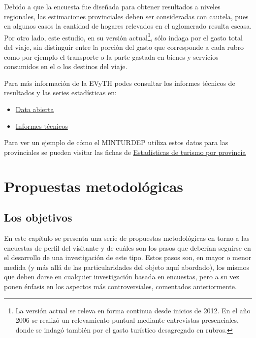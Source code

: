 \documentclass[
]{book}
\providecommand{\tightlist}{%
  \setlength{\itemsep}{0pt}\setlength{\parskip}{0pt}}
\begin{document}
Debido a que la encuesta fue diseñada para obtener resultados a niveles regionales, las estimaciones provinciales deben ser consideradas con cautela, pues en algunos casos la cantidad de hogares relevados en el aglomerado resulta escasa. Por otro lado, este estudio, en su versión actual\footnote{La versión actual se releva en forma continua desde inicios de 2012. En el año 2006 se realizó un relevamiento puntual mediante entrevistas presenciales, donde se indagó también por el gasto turístico desagregado en rubros.}, sólo indaga por el gasto total del viaje, sin distinguir entre la porción del gasto que corresponde a cada rubro como por ejemplo el transporte o la parte gastada en bienes y servicios consumidos en el o los destinos del viaje.

Para más información de la EVyTH podes consultar los informes técnicos de resultados y las series estadísticas en:

\begin{itemize}
\tightlist
\item
  \href{http://datos.yvera.gob.ar/dataset/encuesta-viajes-turismo-hogares-evyth}{Data abierta}\\
\item
  \href{https://www.yvera.tur.ar/estadistica/informe/info/encuesta-de-viajes-y-turismo-de-los-hogares-evyth}{Informes técnicos}
\end{itemize}

Para ver un ejemplo de cómo el MINTURDEP utiliza estos datos para las provinciales se pueden visitar las fichas de \href{https://www.yvera.tur.ar/estadistica/informe/info/estadisticas-de-turismo-por-provincias}{Estadísticas de turismo por provincia}

\hypertarget{propuestas-metodologicas}{%
\chapter{\texorpdfstring{\textbf{Propuestas metodológicas}}{Propuestas metodológicas}}\label{propuestas-metodologicas}}

\hypertarget{los-objetivos}{%
\section{Los objetivos}\label{los-objetivos}}

En este capítulo se presenta una serie de propuestas metodológicas en torno a las encuestas de perfil del visitante y de cuáles son los pasos que deberían seguirse en el desarrollo de una investigación de este tipo. Estos pasos son, en mayor o menor medida (y más allá de las particularidades del objeto aquí abordado), los mismos que deben darse en cualquier investigación basada en encuestas, pero a su vez ponen énfasis en los aspectos más controversiales, comentados anteriormente.
\end{document}
